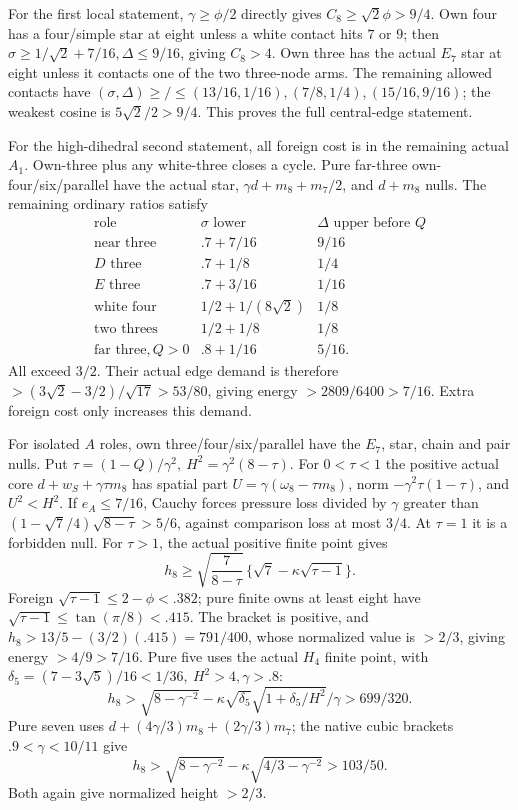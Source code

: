 For the first local statement, \(\gamma\geq\phi/2\) directly
gives \(C_8\geq\sqrt2\phi>9/4\).
Own four has a four/simple star at eight unless a white contact
hits \(7\) or \(9\); then
\(\sigma\geq1/\sqrt2+7/16,\Delta\leq9/16\), giving \(C_8>4\).
Own three has the actual \(E_7\) star at eight unless it contacts
one of the two three-node arms.
The remaining allowed contacts have
\((\sigma,\Delta)\geq/\leq
(13/16,1/16),(7/8,1/4),(15/16,9/16)\);
the weakest cosine is \(5\sqrt2/2>9/4\).
This proves the full central-edge statement.

For the high-dihedral second statement, all foreign cost is in
the remaining actual \(A_1\).
Own-three plus any white-three closes a cycle.
Pure far-three own-four/six/parallel have the actual star,
\(\gamma d+m_8+m_7/2\), and \(d+m_8\) nulls.
The remaining ordinary ratios satisfy
\[
\begin{array}{c|c|c}
\text{role}&\sigma\text{ lower}&\Delta\text{ upper before }Q\\ \hline
\text{near three}&.7+7/16&9/16\\
D\text{ three}&.7+1/8&1/4\\
E\text{ three}&.7+3/16&1/16\\
\text{white four}&1/2+1/(8\sqrt2)&1/8\\
\text{two threes}&1/2+1/8&1/8\\
\text{far three},Q>0&.8+1/16&5/16 .
\end{array}
\]
All exceed \(3/2\). Their actual edge demand is therefore
\(>(3\sqrt2-3/2)/\sqrt{17}>53/80\), giving energy
\(>2809/6400>7/16\).
Extra foreign cost only increases this demand.

For isolated \(A\) roles, own three/four/six/parallel have the
\(E_7\), star, chain and pair nulls.
Put \(\tau=(1-Q)/\gamma^2,\ H^2=\gamma^2(8-\tau)\).
For \(0<\tau<1\) the positive actual core
\(d+w_S+\gamma\tau m_8\) has spatial part
\(U=\gamma(\omega_8-\tau m_8)\), norm
\(-\gamma^2\tau(1-\tau)\), and \(U^2<H^2\).
If \(e_A\leq7/16\), Cauchy forces pressure loss divided by
\(\gamma\) greater than
\((1-\sqrt7/4)\sqrt{8-\tau}>5/6\),
against comparison loss at most \(3/4\).
At \(\tau=1\) it is a forbidden null.
For \(\tau>1\), the actual positive finite point gives
\[
 h_8\geq\sqrt{\frac7{8-\tau}}\,
              \{\sqrt7-\kappa\sqrt{\tau-1}\}.
\]
Foreign \(\sqrt{\tau-1}\leq2-\phi<.382\);
pure finite owns at least eight have
\(\sqrt{\tau-1}\leq\tan(\pi/8)<.415\).
The bracket is positive, and
\(h_8>13/5-(3/2)(.415)=791/400\), whose normalized value
is \(>2/3\), giving energy \(>4/9>7/16\).
Pure five uses the actual \(H_4\) finite point, with
\(\delta_5=(7-3\sqrt5)/16<1/36,\ H^2>4,\gamma>.8\):
\[
 h_8>\sqrt{8-\gamma^{-2}}
 -\kappa\sqrt{\delta_5}\sqrt{1+\delta_5/H^2}/\gamma
 >699/320 .
\]
Pure seven uses \(d+(4\gamma/3)m_8+(2\gamma/3)m_7\);
the native cubic brackets \(.9<\gamma<10/11\) give
\[
 h_8>\sqrt{8-\gamma^{-2}}
 -\kappa\sqrt{4/3-\gamma^{-2}}>103/50 .
\]
Both again give normalized height \(>2/3\).

